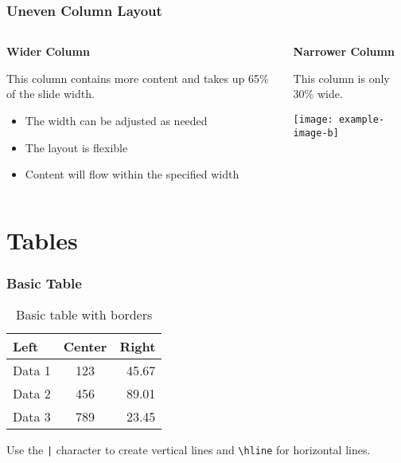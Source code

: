 \documentclass[aspectratio=169,professionalfonts]{beamer}
\begin{document}
\begin{frame}
    \frametitle{Uneven Column Layout}
    
    \begin{columns}[T]
        \begin{column}{0.65\textwidth}
            \textbf{Wider Column}
            
            This column contains more content and takes up 65\% of the slide width.
            
            \begin{itemize}
                \item The width can be adjusted as needed
                \item The layout is flexible
                \item Content will flow within the specified width
            \end{itemize}
        \end{column}
        
        \begin{column}{0.3\textwidth}
            \textbf{Narrower Column}
            
            This column is only 30\% wide.
            
            \texttt{[image: example-image-b]}
        \end{column}
    \end{columns}
\end{frame}

\section{Tables}

\begin{frame}
    \frametitle{Basic Table}
    
    \begin{table}
        \centering
        \begin{tabular}{|l|c|r|}
            \hline
            \textbf{Left} & \textbf{Center} & \textbf{Right} \\
            \hline
            Data 1 & 123 & 45.67 \\
            Data 2 & 456 & 89.01 \\
            Data 3 & 789 & 23.45 \\
            \hline
        \end{tabular}
        \caption{Basic table with borders}
    \end{table}
    
    \vspace{1em}
    
    \begin{tcolorbox}[colback=ugmLightGrey,colframe=ugmBlue,title=Table Usage Tip]
        Use the \texttt{|} character to create vertical lines and \texttt{\textbackslash hline} for horizontal lines.
    \end{tcolorbox}
\end{frame}
\end{document}
